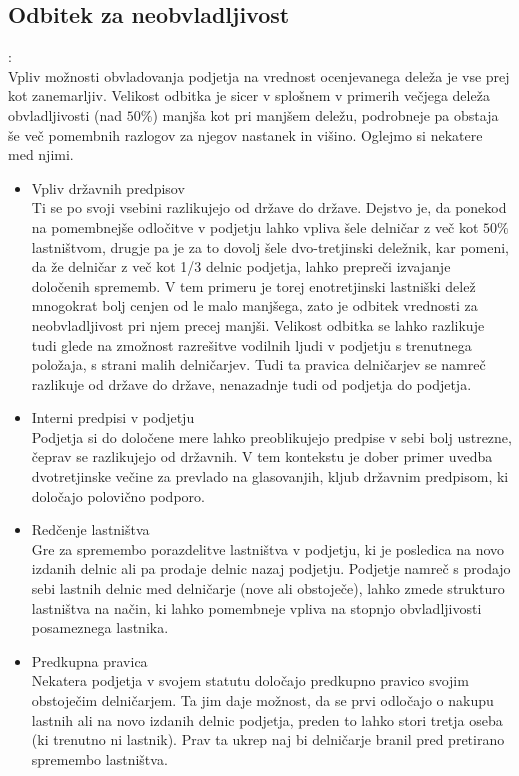 \documentclass[12pt,a4paper]{amsart}
\theoremstyle{definition} %
\theoremstyle{plain} %
\begin{document}
\subsection {Odbitek za neobvladljivost}:\\
Vpliv možnosti obvladovanja podjetja na vrednost ocenjevanega deleža je vse prej kot zanemarljiv. Velikost odbitka je sicer v splošnem v primerih večjega deleža obvladljivosti (nad $50\%$) manjša kot pri manjšem deležu, podrobneje pa obstaja še več pomembnih razlogov za njegov nastanek in višino. Oglejmo si nekatere med njimi.
\begin{itemize}
\item Vpliv državnih predpisov\\
Ti se po svoji vsebini razlikujejo od države do države. Dejstvo je, da ponekod na pomembnejše odločitve v podjetju lahko vpliva šele delničar z več kot $50\%$ lastništvom, drugje pa je za to dovolj šele dvo-tretjinski deležnik, kar pomeni, da že delničar z več kot 1/3 delnic podjetja, lahko prepreči izvajanje določenih sprememb. V tem primeru je torej enotretjinski lastniški delež mnogokrat bolj cenjen od le malo manjšega, zato je odbitek vrednosti za neobvladljivost pri njem precej manjši. Velikost odbitka se lahko razlikuje tudi glede na zmožnost razrešitve vodilnih ljudi v podjetju s trenutnega položaja, s strani malih delničarjev. Tudi ta pravica delničarjev se namreč razlikuje od države do države, nenazadnje tudi od podjetja do podjetja.
\item Interni predpisi v podjetju\\
Podjetja si do določene mere lahko preoblikujejo predpise v sebi bolj ustrezne, čeprav se razlikujejo od državnih. V tem kontekstu je dober primer uvedba dvotretjinske večine za prevlado na glasovanjih, kljub državnim predpisom, ki določajo polovično podporo. 
\item Redčenje lastništva\\
Gre za spremembo porazdelitve lastništva v podjetju, ki je posledica na novo izdanih delnic ali pa prodaje delnic nazaj podjetju. Podjetje namreč s prodajo sebi lastnih delnic med delničarje (nove ali obstoječe), lahko zmede strukturo lastništva na način, ki lahko pomembneje vpliva na stopnjo obvladljivosti posameznega lastnika. 
\item Predkupna pravica\\
Nekatera podjetja v svojem statutu določajo predkupno pravico svojim obstoječim delničarjem. Ta jim daje možnost, da se prvi odločajo o nakupu lastnih ali na novo izdanih delnic podjetja, preden to lahko stori tretja oseba (ki trenutno ni lastnik). Prav ta ukrep naj bi delničarje branil pred pretirano spremembo lastništva. 

\end{itemize}
\end{document}
